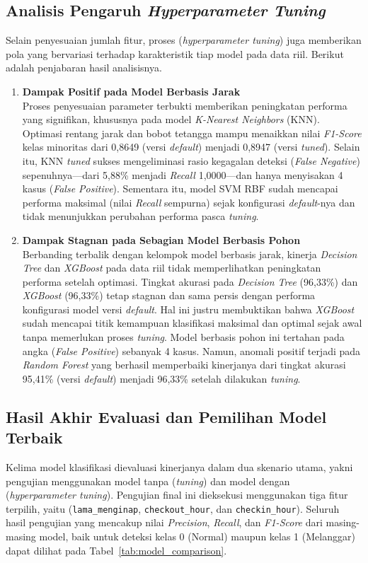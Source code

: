 \subsection{Analisis Pengaruh \textit{Hyperparameter Tuning}}
Selain penyesuaian jumlah fitur, proses (\textit{hyperparameter tuning}) juga memberikan pola yang bervariasi terhadap karakteristik tiap model pada data riil. Berikut adalah penjabaran hasil analisisnya.
\begin{enumerate} 
    
    \item \textbf{Dampak Positif pada Model Berbasis Jarak}\\ Proses penyesuaian parameter terbukti memberikan peningkatan performa yang signifikan, khususnya pada model \textit{K-Nearest Neighbors} (KNN). Optimasi rentang jarak dan bobot tetangga mampu menaikkan nilai \textit{F1-Score} kelas minoritas dari 0,8649 (versi \textit{default}) menjadi 0,8947 (versi \textit{tuned}). Selain itu, KNN \textit{tuned} sukses mengeliminasi rasio kegagalan deteksi (\textit{False Negative}) sepenuhnya—dari 5,88\% menjadi \textit{Recall} 1,0000—dan hanya menyisakan 4 kasus (\textit{False Positive}). Sementara itu, model SVM RBF sudah mencapai performa maksimal (nilai \textit{Recall} sempurna) sejak konfigurasi \textit{default}-nya dan tidak menunjukkan perubahan performa pasca \textit{tuning}.
    \item \textbf{Dampak Stagnan pada Sebagian Model Berbasis Pohon}\\ Berbanding terbalik dengan kelompok model berbasis jarak, kinerja \textit{Decision Tree} dan \textit{XGBoost} pada data riil tidak memperlihatkan peningkatan performa setelah optimasi. Tingkat akurasi pada \textit{Decision Tree} (96,33\%) dan \textit{XGBoost} (96,33\%) tetap stagnan dan sama persis dengan performa konfigurasi model versi \textit{default}. Hal ini justru membuktikan bahwa \textit{XGBoost} sudah mencapai titik kemampuan klasifikasi maksimal dan optimal sejak awal tanpa memerlukan proses \textit{tuning}. Model berbasis pohon ini tertahan pada angka (\textit{False Positive}) sebanyak 4 kasus. Namun, anomali positif terjadi pada \textit{Random Forest} yang berhasil memperbaiki kinerjanya dari tingkat akurasi 95,41\% (versi \textit{default}) menjadi 96,33\% setelah dilakukan \textit{tuning}.
\end{enumerate}

\subsection{Hasil Akhir Evaluasi dan Pemilihan Model Terbaik}
Kelima model klasifikasi dievaluasi kinerjanya dalam dua skenario utama, yakni pengujian menggunakan model tanpa (\textit{tuning}) dan model dengan (\textit{hyperparameter tuning}). Pengujian final ini dieksekusi menggunakan tiga fitur terpilih, yaitu (\texttt{lama\_menginap}, \texttt{checkout\_hour}, dan \texttt{checkin\_hour}). Seluruh hasil pengujian yang mencakup nilai \textit{Precision}, \textit{Recall}, dan \textit{F1-Score} dari masing-masing model, baik untuk deteksi kelas 0 (Normal) maupun kelas 1 (Melanggar) dapat dilihat pada Tabel~\ref{tab:model_comparison}.

